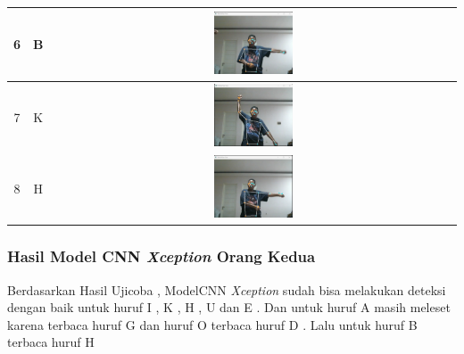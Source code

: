 \begin{table}[!hbt]
\begin{tabular}{|c|c|c|}
	\hline
	6 & B & \includegraphics[width=0.2\textwidth]{gambar/bener/HurufB_ModelCNNResNet50V2_Fachry.png} \\
	\hline
	7 & K & \includegraphics[width=0.2\textwidth]{gambar/bener/HurufK_ModelCNNResNet50V2_Fachry.png} \\
	\hline
	8 & H & \includegraphics[width=0.2\textwidth]{gambar/bener/HurufH_ModelCNNResNet50V2_Fachry.png} \\
	\hline
	\end{tabular}
\end{table}


\subsubsection*{Hasil Model CNN \textit{Xception} Orang Kedua}

Berdasarkan Hasil Ujicoba  , ModelCNN \textit{Xception} sudah bisa melakukan deteksi dengan baik untuk huruf I , K , H , U dan E . Dan untuk huruf A masih meleset karena terbaca huruf G dan huruf O terbaca huruf D . Lalu untuk huruf B terbaca huruf H


